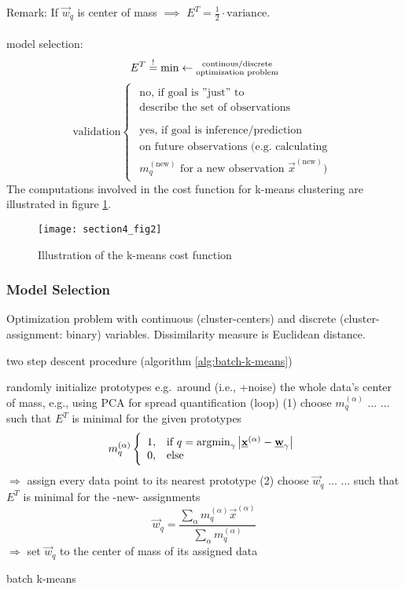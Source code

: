 Remark: If $\vec{w}_q$ is center of mass $\implies$ $E^T = \frac{1}{2} \cdot \mathrm{variance}$.
\\\\
model selection:
\begin{equation}
	E^T \stackrel{\mathrm{!}}{=} \min \leftarrow \substack{	\text{continous/discrete} \\
						\text{optimization problem}}
\end{equation}
\[ \text{validation} \left\{ \begin{array}{c}
	\substack{	\text{no, if goal is ''just'' to} \\
			\text{describe the set of observations}} \\\\
	\substack{	\text{yes, if goal is inference/prediction} \\
			\text{on future observations (e.g. calculating} \\
			m_q^{(\mathrm{new})} \text{ for a new observation }
			\vec{x}^{(\mathrm{new})} \text{)}}
\end{array} \right. \]
The computations involved in the cost function for k-means clustering are illustrated in figure \ref{fig:kMeansCostfunction}. 
\begin{figure}[h!]
  \centering
\texttt{[image: section4\_fig2]}  
  \caption{Illustration of the k-means cost function}
  \label{fig:kMeansCostfunction}
\end{figure}




\subsubsection{Model Selection}
\label{kmeans_modelselection}
Optimization problem with continuous (cluster-centers) and discrete
(cluster-assignment: binary) variables. Dissimilarity measure is Euclidean distance. 
\begin{itemize}
	\itR two step descent procedure (algorithm \ref{alg:batch-k-means})
\end{itemize}
\begin{algorithm}[h!]
\DontPrintSemicolon
  randomly initialize prototypes e.g.\ around (i.e., +noise) the whole data's center of mass, e.g., using PCA for spread quantification\;
  \Begin(loop){
  (1) choose  $m_q^{(\alpha)}$ ... \;
... such that $E^T$ is minimal for the given prototypes\;
\[ m_q^{(\alpha)} \left\{ \begin{array}{ll}
	1, & \text{if } q = \argmin_{\gamma} \big| \vec{x}^{(\alpha)}
		- \vec{w}_{\gamma} \big| \\
	0, & \text{else}
\end{array} \right. \]
$\Rightarrow$ assign every data point to its nearest prototype \;
\;
(2) choose  $\vec{w}_q$ ...\;
... such that $E^T$ is minimal for the -new- assignments\;
\[ \vec{w}_q = \frac{\sum\limits_{\alpha} m_q^{(\alpha)} \vec{x}^{(\alpha)}}{
	\sum\limits_{\alpha} m_q^{(\alpha)}}
\]
$\Rightarrow$ set $\vec{w}_q$ to the center of mass of its assigned data
}
    \label{alg:batch-k-means}
    \caption{batch k-means}
\end{algorithm}

